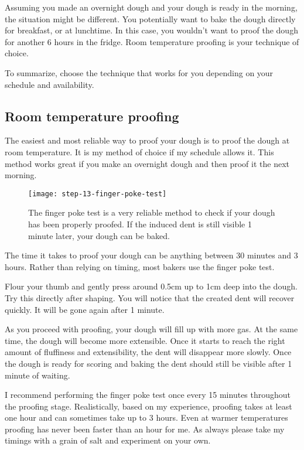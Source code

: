 Assuming you made an overnight dough and your dough is ready in the morning,
the situation might be different. You potentially want to bake the dough directly
for breakfast, or at lunchtime. In this case, you wouldn't want to proof the dough for
another 6 hours in the fridge. Room temperature proofing is your technique
of choice.

To summarize, choose the technique that works for you depending on your
schedule and availability.

\subsection{Room temperature proofing}

The easiest and most reliable way to proof your dough is to proof the dough at
room temperature. It is my method of choice if my schedule allows it. This method
works great if you make an overnight dough and then proof it the next
morning.

\begin{figure}[htb!]
  \texttt{[image: step-13-finger-poke-test]}
  \caption{The finger poke test is a very reliable method to check
  if your dough has been properly proofed. If the induced dent is still
  visible 1 minute later, your dough can be baked.}
  \label{fig:shaping-finger-poke}
\end{figure}

The time it takes to proof your dough can be anything between 30 minutes and
3 hours. Rather than relying on timing, most bakers use the finger poke test.

Flour your thumb and gently press around 0.5cm up to 1cm deep into the dough.
Try this directly after shaping. You will notice that the created dent will
recover quickly. It will be gone again after 1 minute.

As you proceed with proofing, your dough will fill up with more gas. At the
same time, the dough will become more extensible. Once it starts to reach the
right amount of fluffiness and extensibility, the dent will disappear more slowly.
Once the dough is ready for scoring and baking the dent should still be visible after
1 minute of waiting.

I recommend performing the finger poke test once every 15 minutes throughout
the proofing stage. Realistically, based on my experience, proofing takes at least
one hour and can sometimes take up to 3 hours. Even at warmer temperatures proofing
has never been faster than an hour for me. As always please take my timings with
a grain of salt and experiment on your own.

